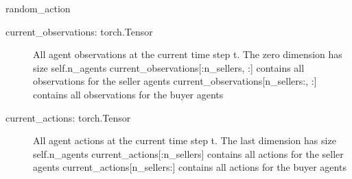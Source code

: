 \documentclass[letterpaper,10pt,english]{sphinxmanual}
\begin{document}
\begin{fulllineitems}
\begin{fulllineitems}
\label{\detokenize{MultiAgentMarketRL:environment.MultiAgentEnvironment.calculate_rewards}}
\end{fulllineitems}


\begin{fulllineitems}
\label{\detokenize{MultiAgentMarketRL:environment.MultiAgentEnvironment.get_actions}}
\end{fulllineitems}


\begin{fulllineitems}
\label{\detokenize{MultiAgentMarketRL:environment.MultiAgentEnvironment.reset}}
\end{fulllineitems}


\begin{fulllineitems}
\label{\detokenize{MultiAgentMarketRL:environment.MultiAgentEnvironment.step}}
\sphinxAtStartPar
random\_action
\begin{description}
\item[{current\_observations: torch.Tensor}] \leavevmode
\sphinxAtStartPar
All agent observations at the current time step t. The zero dimension has size self.n\_agents
current\_observations{[}:n\_sellers, :{]} contains all observations for the seller agents
current\_observations{[}n\_sellers:, :{]} contains all observations for the buyer agents

\item[{current\_actions: torch.Tensor}] \leavevmode
\sphinxAtStartPar
All agent actions at the current time step t. The last dimension has size self.n\_agents
current\_actions{[}:n\_sellers{]} contains all actions for the seller agents
current\_actions{[}n\_sellers:{]} contains all actions for the buyer agents


\end{description}
\end{fulllineitems}
\end{fulllineitems}
\end{document}
